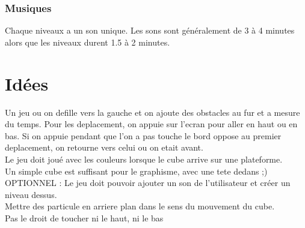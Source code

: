 \documentclass{article}
\begin{document}
\subsubsection{Musiques}
Chaque niveaux a un son unique. Les sons sont généralement de 3 à 4 minutes alors que les niveaux durent 1.5 à 2 minutes.

\section{Idées}
Un jeu ou on defille vers la gauche et on ajoute des obstacles au fur et a mesure du temps. Pour les deplacement, on appuie sur l'ecran pour aller en haut ou en bas. Si on appuie pendant que l'on a pas touche le bord oppose au premier deplacement, on retourne vers celui ou on etait avant.\\


Le jeu doit joué avec les couleurs lorsque le cube arrive sur une plateforme.\\

Un simple cube est suffisant pour le graphisme, avec une tete dedans ;)\\

OPTIONNEL : Le jeu doit pouvoir ajouter un son de l'utilisateur et créer un niveau dessus.\\

Mettre des particule en arriere plan dans le sens du mouvement du cube.\\

Pas le droit de toucher ni le haut, ni le bas
\end{document}
